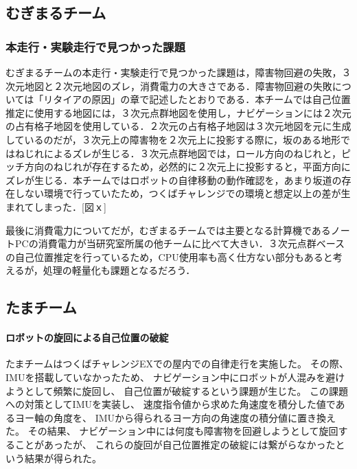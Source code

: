 \documentclass[twocolumn,9pt]{jsproceedings}
\begin{document}


\subsection{むぎまるチーム}
\subsubsection{本走行・実験走行で見つかった課題}

むぎまるチームの本走行・実験走行で見つかった課題は，障害物回避の失敗，３次元地図と２次元地図のズレ，消費電力の大きさである．障害物回避の失敗については「リタイアの原因」の章で記述したとおりである．本チームでは自己位置推定に使用する地図には，３次元点群地図を使用し，ナビゲーションには２次元の占有格子地図を使用している．２次元の占有格子地図は３次元地図を元に生成しているのだが，３次元上の障害物を２次元上に投影する際に，坂のある地形ではねじれによるズレが生じる．３次元点群地図では，ロール方向のねじれと，ピッチ方向のねじれが存在するため，必然的に２次元上に投影すると，平面方向にズレが生じる．本チームではロボットの自律移動の動作確認を，あまり坂道の存在しない環境で行っていたため，つくばチャレンジでの環境と想定以上の差が生まれてしまった．[図ｘ]

最後に消費電力についてだが，むぎまるチームでは主要となる計算機であるノートPCの消費電力が当研究室所属の他チームに比べて大きい．３次元点群ベースの自己位置推定を行っているため，CPU使用率も高く仕方ない部分もあると考えるが，処理の軽量化も課題となるだろう．

\subsection{たまチーム}
\paragraph{ロボットの旋回による自己位置の破綻}


たまチームはつくばチャレンジEXでの屋内での自律走行を実施した。
その際、IMUを搭載していなかったため、
ナビゲーション中にロボットが人混みを避けようとして頻繁に旋回し、
自己位置が破綻するという課題が生じた。
この課題への対策としてIMUを実装し、
速度指令値から求めた角速度を積分した値であるヨー軸の角度を、
IMUから得られるヨー方向の角速度の積分値に置き換えた。
その結果、
ナビゲーション中には何度も障害物を回避しようとして旋回することがあったが、
これらの旋回が自己位置推定の破綻には繋がらなかったという結果が得られた。
\end{document}
